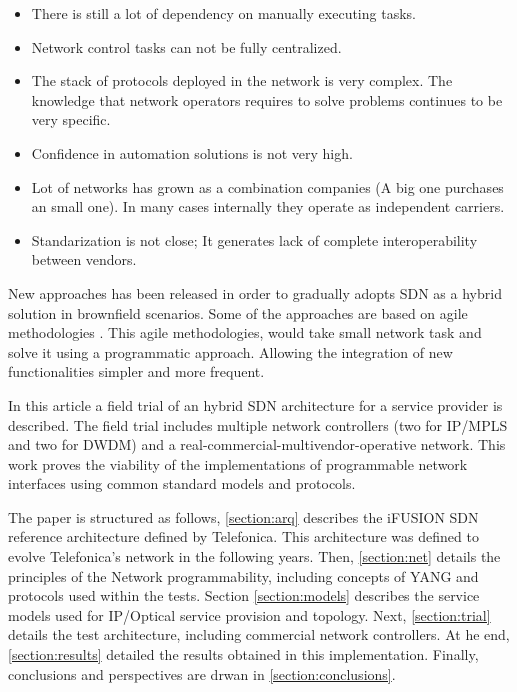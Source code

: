 \documentclass[a4paper,fleqn]{cas-dc}
\begin{document}
\begin{itemize}
    \item There is still a lot of dependency on manually executing tasks.
    \item Network control tasks can not be fully centralized.
    \item The stack of protocols deployed in the network is very complex.  The knowledge that network operators requires to solve problems continues to be very specific.
    \item Confidence in automation solutions is not very high.
    \item Lot of networks has grown as a combination companies (A big one purchases an small one). In many cases internally they operate as independent carriers. \item Standarization is not close; It generates lack of complete interoperability between vendors.
\end{itemize}

New approaches has been released in order to gradually adopts SDN as a hybrid solution in brownfield scenarios. Some of the approaches are based on agile methodologies \cite{devlic2012use,choi2018agile}. 
This agile methodologies, would take small network task and solve it using a programmatic approach. Allowing the integration of new functionalities simpler and more frequent.

In this article a field trial of an hybrid SDN architecture for a service provider is described. The field trial includes multiple network controllers (two for IP/MPLS and two for DWDM) and a real-commercial-multivendor-operative network. This work proves the viability of the implementations of programmable network interfaces using common standard models and protocols.

The paper is structured as follows, \cref{section:arq} describes the i\uppercase{FUSION} SDN reference architecture defined by Telefonica. This architecture was defined to evolve Telefonica's network in the following years. Then, \cref{section:net} details the principles of the Network programmability, including concepts of YANG and protocols used within the tests. Section \cref{section:models} describes the service models used for IP/Optical service provision and topology. Next, \cref{section:trial} details the test architecture, including commercial network controllers. At he end, \cref{section:results} detailed the results obtained in this implementation. Finally, conclusions and perspectives are drwan in \cref{section:conclusions}.    
\end{document}
